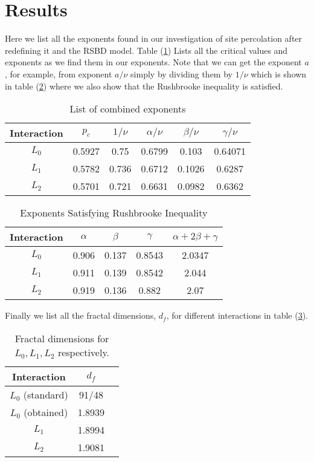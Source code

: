 \section{Results}
Here we list all the exponents found in our investigation of site percolation after redefining it and the RSBD model. Table (\ref{tab:exponents-combined}) Lists all the critical values and exponents as we find them in our exponents. Note that we can get the exponent $a$, for example, from exponent $a/\nu$ simply by dividing them by $1/\nu$ which is shown in table (\ref{tab:rushbrooke}) where we also show that the Rushbrooke inequality is satisfied.
\begin{table}[h]
\centering
\begin{tabular}{|c|c|c|c|c|c|}
	\hline
	Interaction & $p_c$ & $1/\nu$ & $\alpha/\nu$ & $\beta/\nu$ & $\gamma/\nu$ \\ \hline
	$L_0$ & 0.5927 & 0.75  & 0.6799 & 0.103  & 0.64071  \\ \hline
	$L_1$ & 0.5782 & 0.736 & 0.6712 & 0.1026 & 0.6287  \\ \hline
	$L_2$ & 0.5701 & 0.721 & 0.6631 & 0.0982 & 0.6362  \\ \hline
\end{tabular}
\caption{List of combined exponents}
\label{tab:exponents-combined}
\end{table}

\begin{table}[h]
\centering
\begin{tabular}{|c|c|c|c|c|}
	\hline
	Interaction & $\alpha$ & $\beta$ & $\gamma$ & $\alpha+2\beta+\gamma$ \\ \hline
	$L_0$  & 0.906 & 0.137 & 0.8543 & 2.0347   \\ \hline
	$L_1$  & 0.911 & 0.139 & 0.8542 & 2.044   \\ \hline
	$L_2$  & 0.919 & 0.136 & 0.882  & 2.07    \\ \hline
\end{tabular}
\caption{Exponents Satisfying Rushbrooke Inequality}
\label{tab:rushbrooke}
\end{table}

Finally we list all the fractal dimensions, $d_f$, for different interactions in table (\ref{tab:cluster-info}).
\begin{table}[h]
	\centering
	\begin{tabular}{|c|c|c|}
		\hline
		Interaction 	& $d_f$     \\ \hline
		$L_0$ (standard) 	& 91/48     \\ \hline
		$L_0$ (obtained)	& 1.8939   \\ \hline
		$L_1$				& 1.8994      \\ \hline
		$L_2$				& 1.9081     \\ \hline
	\end{tabular}
	\caption{Fractal dimensions for $L_0,L_1,L_2$ respectively.}
	\label{tab:cluster-info}
\end{table}
		

